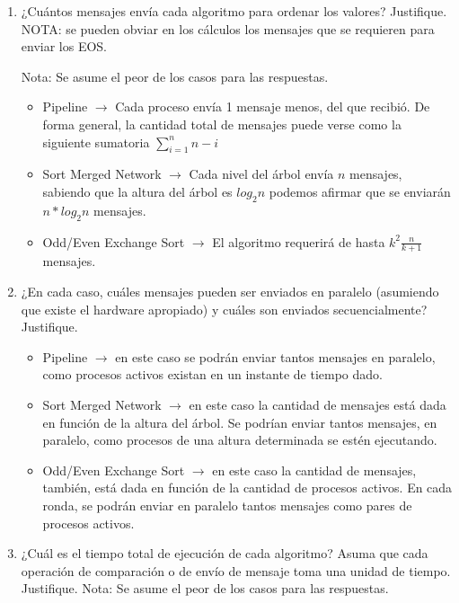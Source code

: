 \documentclass[a4paper, 10pt]{article}
\newenvironment{QandA}{
    \begin{enumerate}\bfseries}
    {\end{enumerate}
}
\newenvironment{answered}{\par\normalfont}{}
\begin{document}
\begin{QandA}
\begin{enumerate}
\item ¿Cuántos mensajes envía cada algoritmo para ordenar los valores? Justifique. NOTA: se pueden obviar en los cálculos los mensajes que se requieren para enviar los EOS.
\begin{answered}
Nota: Se asume el peor de los casos para las respuestas.
\begin{itemize}
    \item Pipeline $\rightarrow$ Cada proceso envía 1 mensaje menos, del que recibió. De forma general, la cantidad total de mensajes puede verse como la siguiente sumatoria $\sum_{i=1}^n n-i$
    \item Sort Merged Network $\rightarrow$ Cada nivel del árbol envía $n$ mensajes, sabiendo que la altura del árbol es $log_2 n$ podemos afirmar que se enviarán $n * log_2 n$ mensajes.
    \item Odd/Even Exchange Sort $\rightarrow$ El algoritmo requerirá de hasta $k^2 \frac{n}{k+1}$ mensajes.
\end{itemize}
\end{answered}
\item ¿En cada caso, cuáles mensajes pueden ser enviados en paralelo (asumiendo que existe el hardware apropiado) y cuáles son enviados secuencialmente? Justifique.
\begin{answered}
\begin{itemize}
    \item Pipeline $\rightarrow$ en este caso se podrán enviar tantos mensajes en paralelo, como procesos activos existan en un instante de tiempo dado.
    \item Sort Merged Network $\rightarrow$ en este caso la cantidad de mensajes está dada en función de la altura del árbol. Se podrían enviar tantos mensajes, en paralelo, como procesos de una altura determinada se estén ejecutando.
    \item Odd/Even Exchange Sort $\rightarrow$ en este caso la cantidad de mensajes, también, está dada en función de la cantidad de procesos activos. En cada ronda, se podrán enviar en paralelo tantos mensajes como pares de procesos activos.
\end{itemize}
\end{answered}
\item ¿Cuál es el tiempo total de ejecución de cada algoritmo? Asuma que cada operación de comparación o de envío de mensaje toma una unidad de tiempo. Justifique.
Nota: Se asume el peor de los casos para las respuestas.
\begin{answered}
\begin{itemize}

\end{itemize}
\end{answered}
\end{enumerate}
\end{QandA}
\end{document}
